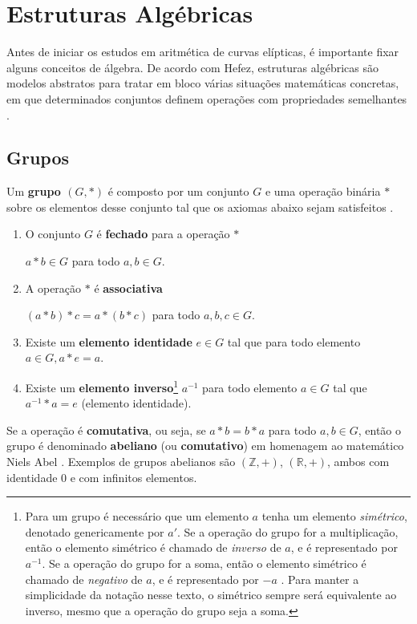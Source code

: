 %
%
\section{Estruturas Algébricas}

Antes de iniciar os estudos em aritmética de curvas elípticas, é importante
fixar alguns conceitos de álgebra. De acordo com Hefez, estruturas algébricas são modelos abstratos para tratar em bloco várias situações matemáticas concretas, em que determinados conjuntos definem operações com propriedades semelhantes \cite{Hefez:2008}.

%
%
\subsection{Grupos}

Um \textbf{grupo \((G,*)\)} é composto por um conjunto \(G\) e uma operação binária \(*\) sobre os elementos desse conjunto tal que os axiomas abaixo sejam satisfeitos \cite{Gilbert:2004}.

\begin{enumerate}
\item O conjunto \(G\) é \textbf{fechado} para a operação \(*\)

$a * b \in G$ para todo $a,b \in G$.

\item A operação $*$ é \textbf{associativa}

$(a * b) * c = a * (b * c)$ para todo $a,b,c \in G$.

\item Existe um \textbf{elemento identidade} $e \in G$ tal que para todo elemento $a \in G, a * e = a$.
\item Existe um \textbf{elemento inverso}\footnote{Para um grupo é necessário que um elemento \(a\) tenha um elemento \textit{simétrico}, denotado genericamente por \(a'\). Se a operação do grupo for a multiplicação, então o elemento simétrico é chamado de \textit{inverso} de \(a\), e é representado por \(a^{-1}\). Se a operação do grupo for a soma, então o elemento simétrico é chamado de \textit{negativo} de \(a\), e é representado por \(-a\) \cite{Domingues:2003}. Para manter a simplicidade da notação nesse texto, o simétrico sempre será equivalente ao inverso, mesmo que a operação do grupo seja a soma.} \(a^{-1}\) para todo elemento $a \in G$ tal que $a^{-1} * a = e$ (elemento identidade).
\end{enumerate}

Se a operação é \textbf{comutativa}, ou seja, se $a * b = b * a$ para todo $a, b \in G$, então o grupo é denominado \textbf{abeliano} (ou \textbf{comutativo}) em homenagem ao matemático Niels Abel \cite{Gilbert:2004}.
Exemplos de grupos abelianos são $(\mathds{Z}, +)$, $(\mathds{R}, +)$, ambos com identidade 0 e com infinitos elementos. 

